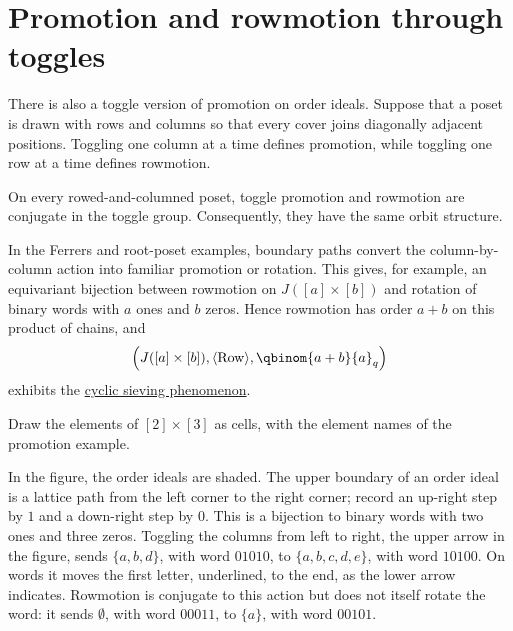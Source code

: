 \section[rowmotionPromotionConjugacy]{Promotion and rowmotion through toggles}

There is also a toggle version of promotion on order ideals.  Suppose that a
poset is drawn with rows and columns so that every cover joins diagonally
adjacent positions.  Toggling one column at a time defines promotion, while
toggling one row at a time defines rowmotion.

\begin{theorem}
On every rowed-and-columned poset, toggle promotion and rowmotion are
conjugate in the toggle group.  Consequently, they have the same orbit
structure.
\end{theorem}

In the Ferrers and root-poset examples, boundary paths convert the
column-by-column action into familiar promotion or rotation.  This gives, for
example, an equivariant bijection between rowmotion on $J([a]\times[b])$ and
rotation of binary words with $a$ ones and $b$ zeros.  Hence rowmotion has
order $a+b$ on this product of chains, and
\[
  \left(J([a]\times[b]),\langle\operatorname{Row}\rangle,
  \qbinom{a+b}{a}_q\right)
\]
exhibits the \hyperref[cyclicSieving]{cyclic sieving phenomenon}.

\begin{example*}
Draw the elements of $[2]\times[3]$ as cells, with the element names of the
promotion example.
\begin{figure}
\end{figure}

In the figure, the order ideals are shaded.  The upper boundary of an order
ideal is a lattice path from the left corner to the right corner; record an
up-right step by $1$ and a down-right step by $0$.  This is a bijection to
binary words with two ones and three zeros.  Toggling the columns from left to
right, the upper arrow in the figure, sends $\{a,b,d\}$, with word $01010$, to
$\{a,b,c,d,e\}$, with word $10100$.  On words it moves the first letter, underlined, to the
end, as the lower arrow indicates.  Rowmotion is conjugate to this action but
does not itself rotate the word: it sends $\emptyset$, with word $00011$, to
$\{a\}$, with word $00101$.
\end{example*}

